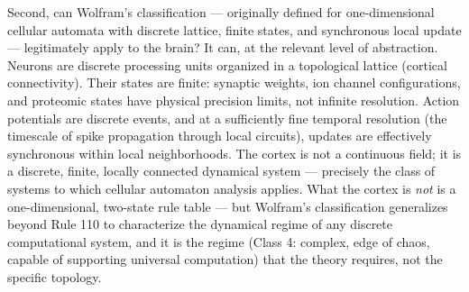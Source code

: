 \documentclass[12pt]{article}
\begin{document}
Second, can Wolfram's classification --- originally defined for one-dimensional cellular automata with discrete lattice, finite states, and synchronous local update --- legitimately apply to the brain? It can, at the relevant level of abstraction. Neurons are discrete processing units organized in a topological lattice (cortical connectivity). Their states are finite: synaptic weights, ion channel configurations, and proteomic states have physical precision limits, not infinite resolution. Action potentials are discrete events, and at a sufficiently fine temporal resolution (the timescale of spike propagation through local circuits), updates are effectively synchronous within local neighborhoods. The cortex is not a continuous field; it is a discrete, finite, locally connected dynamical system --- precisely the class of systems to which cellular automaton analysis applies. What the cortex is \emph{not} is a one-dimensional, two-state rule table --- but Wolfram's classification generalizes beyond Rule 110 to characterize the dynamical regime of any discrete computational system, and it is the regime (Class 4: complex, edge of chaos, capable of supporting universal computation) that the theory requires, not the specific topology.
\end{document}
